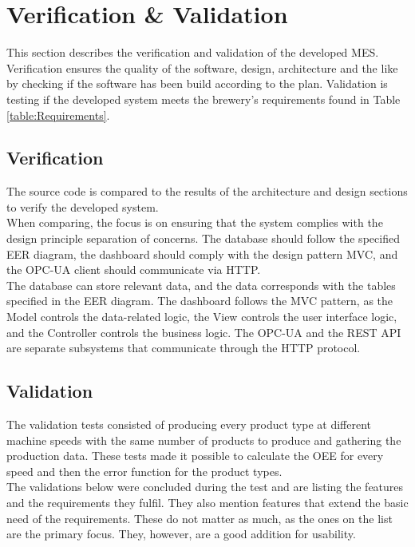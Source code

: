 \section{Verification \& Validation}
This section describes the verification and validation of the developed MES.\\

Verification ensures the quality of the software, design, architecture and the
like by checking if the software has been build according to the plan.
Validation is testing if the developed system meets the brewery's requirements
found in Table \ref{table:Requirements}.

\subsection{Verification}
The source code is compared to the results of the architecture and design
sections to verify the developed system. \\

When comparing, the focus is on ensuring that the system complies with the
design principle separation of concerns. The database should follow the
specified EER diagram, the dashboard should comply with the design pattern MVC,
and the OPC-UA client should communicate via HTTP. \\

The database can store relevant data, and the data corresponds with the tables
specified in the EER diagram. The dashboard follows the MVC pattern, as the
Model controls the data-related logic, the View controls the user interface
logic, and the Controller controls the business logic. The OPC-UA and the REST
API are separate subsystems that communicate through the HTTP protocol. 


\subsection{Validation}
The validation tests consisted of producing every product type at different
machine speeds with the same number of products to produce and gathering the
production data. These tests made it possible to calculate the OEE for every
speed and then the error function for the product types.\\

The validations below were concluded during the test and are listing the
features and the requirements they fulfil. They also mention features that
extend the basic need of the requirements. These do not matter as much, as the
ones on the list are the primary focus. They, however, are a good addition for
usability.

